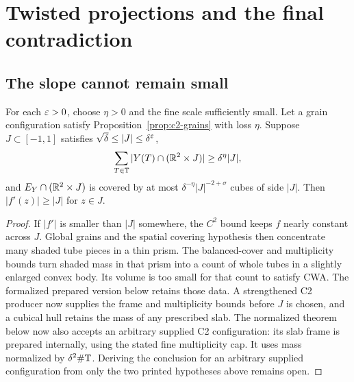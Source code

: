 \chapter{Twisted projections and the final contradiction}
\label{chap:twisted}

\section{The slope cannot remain small}

\begin{lemma}
\label{lem:large-slope}
For each $\varepsilon>0$, choose $\eta>0$ and the fine scale sufficiently
small. Let a grain configuration satisfy Proposition~\ref{prop:c2-grains}
with loss $\eta$. Suppose $J\subset[-1,1]$ satisfies
$\sqrt\delta\leq |J|\leq\delta^\varepsilon$,
\[
 \sum_{T\in\mathbb{T}}|Y(T)\cap(\mathbb{R}^2\times J)|\geq\delta^\eta|J|,
\]
and $E_Y\cap(\mathbb{R}^2\times J)$ is covered by at most
$\delta^{-\eta}|J|^{-2+\sigma}$ cubes of side $|J|$.
Then $|f'(z)|\geq |J|$ for $z\in J$.
\end{lemma}
\begin{proof}
If $|f'|$ is smaller than $|J|$ somewhere, the $C^2$ bound keeps
$f$ nearly constant across $J$. Global grains and the spatial covering
hypothesis then concentrate many shaded tube pieces in a thin prism.
The balanced-cover and multiplicity bounds turn shaded mass in that
prism into a count of whole tubes in a slightly enlarged convex body.
Its volume is too small for that count to satisfy CWA. The
formalized prepared version below retains those data. A strengthened
C2 producer now supplies the frame and multiplicity bounds before $J$
is chosen, and a cubical hull retains the mass of any prescribed slab.
The normalized theorem below now also accepts an arbitrary supplied C2
configuration: its slab frame is prepared internally, using the stated
fine multiplicity cap. It uses mass normalized by $\delta^2\#\mathbb{T}$.
Deriving the conclusion for an arbitrary supplied configuration from
only the two printed hypotheses above remains open.
\end{proof}

